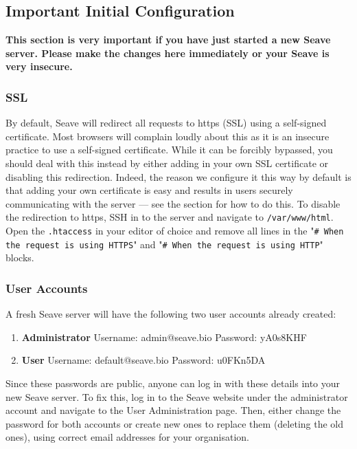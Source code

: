 \documentclass[11pt, a4paper]{article}
\begin{document}

\subsection{Important Initial Configuration}\label{initialConfiguration}

{\large\textbf{\color{red}This section is very important if you have just started a new Seave server. Please make the changes here immediately or your Seave is very insecure.}}

\subsubsection{SSL}

By default, Seave will redirect all requests to https (SSL) using a self-signed certificate. Most browsers will complain loudly about this as it is an insecure practice to use a self-signed certificate. While it can be forcibly bypassed, you should deal with this instead by either adding in your own SSL certificate or disabling this redirection. Indeed, the reason we configure it this way by default is that adding your own certificate is easy and results in users securely communicating with the server --- see the  section for how to do this. To disable the redirection to https, SSH in to the server and navigate to \texttt{/var/www/html}. Open the \texttt{.htaccess} in your editor of choice and remove all lines in the "\texttt{\# When the request is using HTTPS}" and "\texttt{\# When the request is using HTTP}" blocks.

\subsubsection{User Accounts}

A fresh Seave server will have the following two user accounts already created:
\begin{enumerate}
	\item \textbf{Administrator} Username: admin@seave.bio Password: yA0s8KHF
	\item \textbf{User} Username: default@seave.bio Password: u0FKn5DA
\end{enumerate}

Since these passwords are public, anyone can log in with these details into your new Seave server. To fix this, log in to the Seave website under the administrator account and navigate to the User Administration page. Then, either change the password for both accounts or create new ones to replace them (deleting the old ones), using correct email addresses for your organisation.
\end{document}
